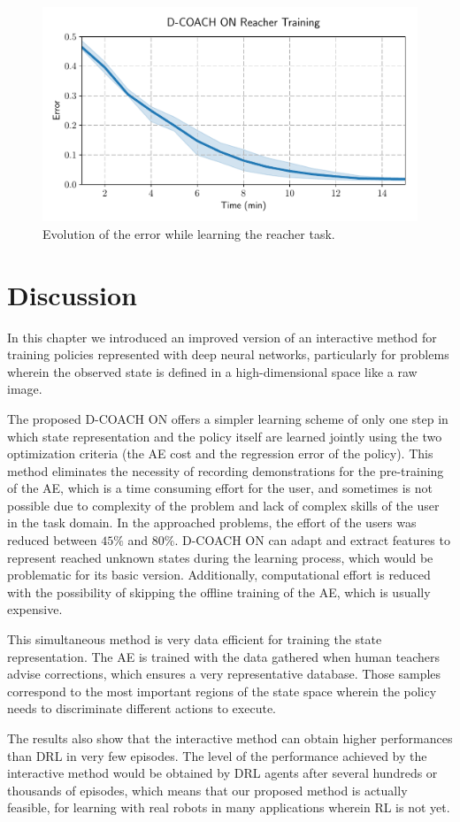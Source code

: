 \begin{figure}[H]
    \centering
    \includegraphics[width=0.8\linewidth]{imagenes/cap3/reacher_ICRA.pdf}
    \caption{Evolution of the error while learning the reacher task. }
    \label{fig:reacher_exp}
\end{figure}

\section{Discussion}

In this chapter we introduced an improved version of an interactive method for training policies represented with deep neural networks, particularly for problems wherein the observed state is defined in a high-dimensional space like a raw image.

The proposed D-COACH ON offers a simpler learning scheme of only one step in which state representation and the policy itself are learned jointly using the two optimization criteria (the AE cost and the regression error of the policy). This method eliminates the necessity of recording demonstrations for the pre-training of the AE, which is a time consuming effort for the user, and sometimes is not possible due to complexity of the problem and lack of complex skills of the user in the task domain. In the approached problems, the effort of the users was reduced between $45\%$ and $80\%$. D-COACH ON can adapt and extract features to represent reached unknown states during the learning process, which would be problematic for its basic version. Additionally, computational effort is reduced with the possibility of skipping the offline training of the AE, which is usually expensive. 

This simultaneous method is very data efficient for training the state representation. The AE is trained with the data gathered when human teachers advise corrections, which ensures a very representative database. Those samples correspond to the most important regions of the state space wherein the policy needs to discriminate different actions to execute.

The results also show that the interactive method can obtain higher performances than DRL in very few episodes. The level of the performance achieved by the interactive method would be obtained by DRL agents after several hundreds or thousands of episodes, which means that our proposed method is actually feasible, for learning with real robots in many applications wherein RL is not yet.